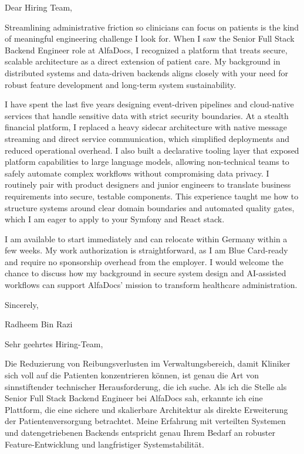\documentclass[11pt,a4paper]{coverletter}
\begin{document}

\opening{Dear Hiring Team,}

Streamlining administrative friction so clinicians can focus on patients is the kind of meaningful engineering challenge I look for. When I saw the Senior Full Stack Backend Engineer role at AlfaDocs, I recognized a platform that treats secure, scalable architecture as a direct extension of patient care. My background in distributed systems and data-driven backends aligns closely with your need for robust feature development and long-term system sustainability.

I have spent the last five years designing event-driven pipelines and cloud-native services that handle sensitive data with strict security boundaries. At a stealth financial platform, I replaced a heavy sidecar architecture with native message streaming and direct service communication, which simplified deployments and reduced operational overhead. I also built a declarative tooling layer that exposed platform capabilities to large language models, allowing non-technical teams to safely automate complex workflows without compromising data privacy. I routinely pair with product designers and junior engineers to translate business requirements into secure, testable components. This experience taught me how to structure systems around clear domain boundaries and automated quality gates, which I am eager to apply to your Symfony and React stack.

I am available to start immediately and can relocate within Germany within a few weeks. My work authorization is straightforward, as I am Blue Card-ready and require no sponsorship overhead from the employer. I would welcome the chance to discuss how my background in secure system design and AI-assisted workflows can support AlfaDocs’ mission to transform healthcare administration.

\closing{Sincerely,}{Radheem Bin Razi}

\clearpage
{}


\opening{Sehr geehrtes Hiring-Team,}

Die Reduzierung von Reibungsverlusten im Verwaltungsbereich, damit Kliniker sich voll auf die Patienten konzentrieren können, ist genau die Art von sinnstiftender technischer Herausforderung, die ich suche. Als ich die Stelle als Senior Full Stack Backend Engineer bei AlfaDocs sah, erkannte ich eine Plattform, die eine sichere und skalierbare Architektur als direkte Erweiterung der Patientenversorgung betrachtet. Meine Erfahrung mit verteilten Systemen und datengetriebenen Backends entspricht genau Ihrem Bedarf an robuster Feature-Entwicklung und langfristiger Systemstabilität.
\end{document}
